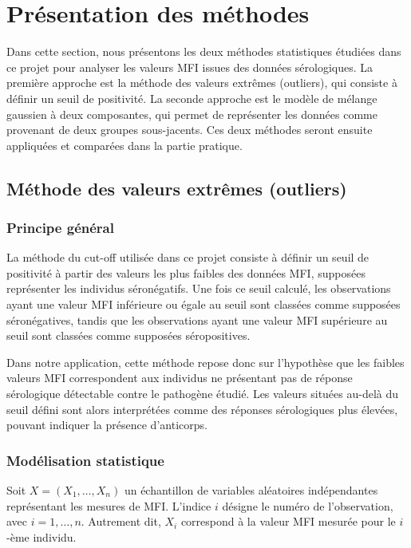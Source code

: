 \documentclass[a4paper]{article}
\begin{document}
\section{Présentation des méthodes}

Dans cette section, nous présentons les deux méthodes statistiques étudiées dans ce projet pour analyser les valeurs MFI issues des données sérologiques. La première approche est la méthode des valeurs extrêmes (outliers), qui consiste à définir un seuil de positivité. La seconde approche est le modèle de mélange gaussien à deux composantes, qui permet de représenter les données comme provenant de deux groupes sous-jacents. Ces deux méthodes seront ensuite appliquées et comparées dans la partie pratique.

\subsection{Méthode des valeurs extrêmes (outliers)}

\subsubsection{Principe général} 

La méthode du cut-off utilisée dans ce projet consiste à définir un seuil de positivité à partir des valeurs les plus faibles des données MFI, supposées représenter les individus séronégatifs. Une fois ce seuil calculé, les observations ayant une valeur MFI inférieure ou égale au seuil sont classées comme supposées séronégatives, tandis que les observations ayant une valeur MFI supérieure au seuil sont classées comme supposées séropositives.

Dans notre application, cette méthode repose donc sur l'hypothèse que les faibles valeurs MFI correspondent aux individus ne présentant pas de réponse sérologique détectable contre le pathogène étudié. Les valeurs situées au-delà du seuil défini sont alors interprétées comme des réponses sérologiques plus élevées, pouvant indiquer la présence d'anticorps.

\subsubsection{Modélisation statistique} 

Soit \(X = (X_1, \ldots, X_n)\) un échantillon de variables aléatoires indépendantes représentant les mesures de MFI. L’indice \(i\) désigne le numéro de l’observation, avec \(i = 1, \ldots, n\). Autrement dit, \(X_i\) correspond à la valeur MFI mesurée pour le \(i\)-ème individu.
\end{document}
